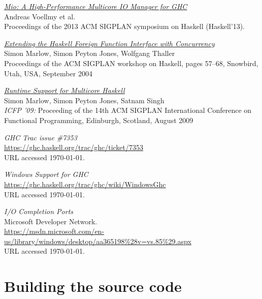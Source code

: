 \documentclass[a4paper,11pt,oneside]{report}
\begin{document}
\begin{thebibliography}{9}
  \href{http://haskell.cs.yale.edu/wp-content/uploads/2013/08/hask035-voellmy.pdf}{\emph{Mio:
      A High-Performance Multicore IO
      Manager for GHC}}\\
  \newblock Andreas Voellmy et al.\\
  \newblock Proceedings of the 2013 ACM SIGPLAN symposium on Haskell (Haskell'13).

  \href{http://community.haskell.org/~simonmar/bib/concffi04_abstract.html}{\emph{Extending the Haskell Foreign Function Interface with Concurrency}}\\
  \newblock Simon Marlow, Simon Peyton Jones, Wolfgang Thaller\\
  \newblock Proceedings of the ACM SIGPLAN workshop on Haskell, pages 57--68,
  Snowbird, Utah, USA, September 2004

  \href{http://community.haskell.org/~simonmar/bib/multicore-ghc-09_abstract.html}{\emph{Runtime Support for Multicore Haskell}}\\
  \newblock Simon Marlow, Simon Peyton Jones, Satnam Singh\\
  \newblock \emph{ICFP '09:} Proceeding of the 14th ACM SIGPLAN International
  Conference on Functional Programming, Edinburgh, Scotland, August 2009

 \emph{GHC Trac issue \#7353}\\
  \newblock \url{https://ghc.haskell.org/trac/ghc/ticket/7353}\\
  \newblock URL accessed \today.

 \emph{Windows Support for GHC}\\
  \newblock \url{https://ghc.haskell.org/trac/ghc/wiki/WindowsGhc}\\
  \newblock URL accessed \today.

 \emph{I/O Completion Ports}\\
  \newblock Microsoft Developer Network.\\
  \newblock
  \url{https://msdn.microsoft.com/en-us/library/windows/desktop/aa365198\%28v=vs.85\%29.aspx}\\
  \newblock URL accessed \today.

\end{thebibliography}

\appendix

\chapter{Building the source code}
\end{document}
